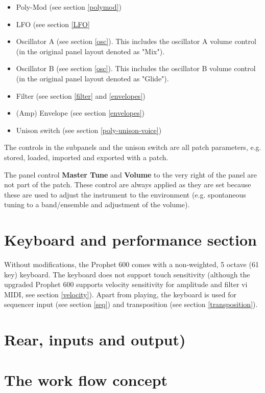 \documentclass[landscape, 11pt, oneside]{report}
\newenvironment{flowtext}{\addmargin[0cm]{7cm}}{\endaddmargin} %
\begin{document}
\begin{flowtext}
\begin{itemize}
  \item Poly-Mod (see section \ref{polymod})
  \item LFO (see section \ref{LFO}
  \item Oscillator A (see section \ref{osc}). This includes the oscillator A volume control (in the original panel layout denoted as "Mix").
  \item Oscillator B (see section \ref{osc}). This includes the oscillator B volume control (in the original panel layout denoted as "Glide").
  \item Filter (see section \ref{filter} and \ref{envelopes}) 
  \item (Amp) Envelope (see section \ref{envelopes})
  \item Unison switch (see section \ref{poly-unison-voice})
\end{itemize}

The controls in the subpanels and the unison switch are all patch parameters, e.g. stored, loaded, imported and exported with a patch. 

The panel control \textbf{Master Tune} and \textbf{Volume} to the very right of the panel are not part of the patch. These control are always applied as they are set because these are used to adjust the instrument to the environment (e.g. spontaneous tuning to a band/ensemble and adjustment of the volume).

\section{Keyboard and performance section}

Without modifications, the Prophet 600 comes with a non-weighted, 5 octave (61 key) keyboard. The keyboard does not support touch sensitivity (although the upgraded Prophet 600 supports velocity sensitivity for amplitude and filter vi MIDI, see section \ref{velocity}). Apart from playing, the keyboard is used for sequencer input (see section \ref{seq}) and transposition (see section \ref{transposition}). 

\section{Rear, inputs and output)}



\section{The work flow concept}


\end{flowtext}
\end{document}
